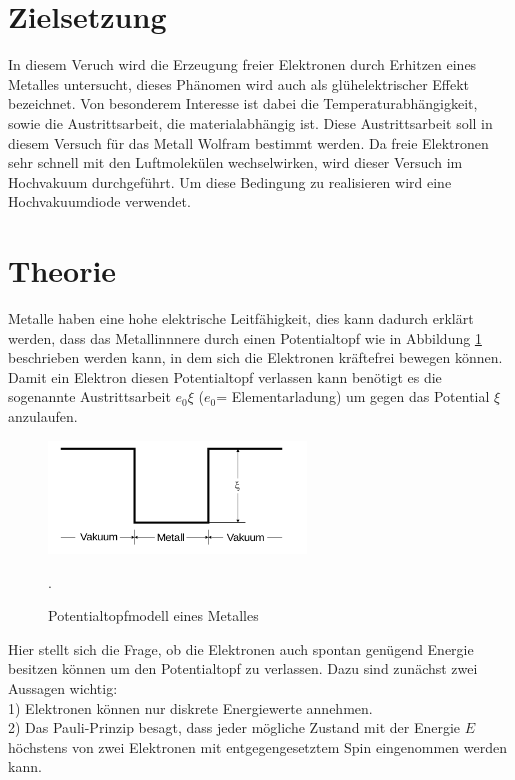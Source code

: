 \section{Zielsetzung}
In diesem Veruch wird die Erzeugung freier Elektronen durch Erhitzen eines
Metalles untersucht, dieses Phänomen wird auch als glühelektrischer Effekt
bezeichnet. Von besonderem Interesse ist dabei die Temperaturabhängigkeit, sowie
die Austrittsarbeit, die materialabhängig ist. Diese Austrittsarbeit soll
in diesem Versuch für das Metall Wolfram bestimmt werden.
Da freie Elektronen sehr schnell mit den Luftmolekülen wechselwirken, wird dieser
Versuch im Hochvakuum durchgeführt. Um diese Bedingung zu realisieren wird eine
Hochvakuumdiode verwendet.

\section{Theorie}
Metalle haben eine hohe elektrische Leitfähigkeit, dies kann dadurch erklärt werden, dass
das Metallinnnere durch einen Potentialtopf wie in Abbildung \ref{fig:topf} beschrieben werden kann,
in dem sich die Elektronen kräftefrei bewegen können. Damit ein Elektron
diesen Potentialtopf verlassen kann benötigt es die sogenannte Austrittsarbeit
$e_{0}\xi$ ($e_{0}$= Elementarladung) um gegen das Potential $\xi$ anzulaufen.
\begin{figure}
  \centering
  \includegraphics[height=3cm]{potentialtopf.png}
  \caption{Potentialtopfmodell eines Metalles}
  \label{fig:topf}
  \cite{skript}.
\end{figure}

Hier stellt sich die Frage, ob die Elektronen auch spontan genügend Energie besitzen
können um den Potentialtopf zu verlassen. Dazu sind zunächst zwei Aussagen wichtig:\\
1) Elektronen können nur diskrete Energiewerte annehmen.\\
2) Das Pauli-Prinzip besagt, dass jeder mögliche Zustand mit der Energie $E$ höchstens
\:\:\: von zwei Elektronen mit entgegengesetztem Spin eingenommen werden kann.\\

